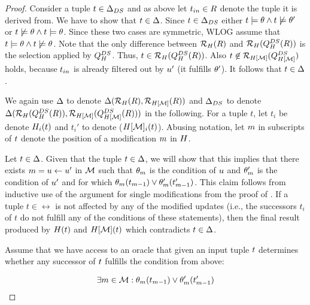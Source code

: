 \begin{proof}
\proofpar{$\dfull \supseteq \dslice$:}
%
Consider a tuple $t \in \Delta_{DS}$ and as above let $t_{in} \in R$ denote the tuple it is derived from. We have to show that $t \in \Delta$. Since $t \in \Delta_{DS}$ either $t \models \theta \land t \not\models \theta'$ or $t \not\models \theta \land t \models \theta$. Since these two cases are symmetric, WLOG assume that $t \models \theta \land t \not\models \theta$. Note that the only difference between  $\mathcal{R}_{H}(R)$ and $\mathcal{R}_{H}(Q_{H}^{DS}(R))$ is the selection applied by $Q_{H}^{DS}$. Thus, $t \in \mathcal{R}_{H}(Q_{H}^{DS}(R))$. Also $t \not\in \mathcal{R}_{H[\mathcal{M}]}(Q_{H[\mathcal{M}]}^{DS})$ holds, because $t_{in}$ is already filtered out by $u'$ (it fulfills $\theta'$). It follows that $t \in \Delta$.

We again use $\Delta$ to denote $\Delta(\mathcal{R}_{H}(R),\mathcal{R}_{H[\mathcal{M}]}(R))$ and $\Delta_{DS}$ to denote $\Delta(\mathcal{R}_{H}(Q_{H}^{DS}(R)),\mathcal{R}_{H[\mathcal{M}]}(Q_{H[\mathcal{M}]}^{DS}(R)))$ in the following. For a tuple $t$, let $t_i$ be denote $H_i(t)$ and $t_i'$ to denote ($H[\mathcal{M}]_i(t)$). Abusing notation, let $m$ in subscripts of $t$ denote the position of a modification $m$ in $H$.

\proofpar{$\dfull \subseteq \dslice$:}
Let $t \in \Delta$. Given that the tuple $t \in \Delta$, we will show that this implies that there exists $m = u \gets u'$ in $\mathcal{M}$ such that $\theta_m$ is the condition of $u$ and $\theta_{m}'$ is the condition of $u'$ and for which $\theta_m(t_{m -1}) \vee \theta_{m}'(t_{m -1}')$. This claim follows from inductive use of the  argument for single modifications from the proof of . If a tuple $t \in \rel$ is not affected by any of the modified updates (i.e., the successors $t_i$ of $t$ do not fulfill any of the conditions of these statements), then the final result produced by $H(t)$ and $H[\mathcal{M}](t)$ which contradicts $t \in \Delta$.

Assume that we have access to an oracle that given an input tuple $t$ determines whether any successor of $t$ fulfills the condition from above:

\[
  \exists m \in \mathcal{M}: \theta_m(t_{m -1}) \vee \theta_{m}'(t_{m -1}')
\]


\end{proof}
